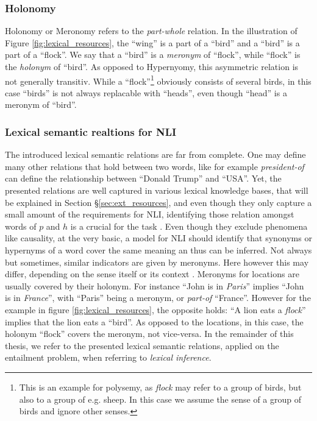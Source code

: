 \subsubsection{Holonomy}
Holonomy or Meronomy refers to the \textit{part-whole} relation. In the illustration of Figure \ref{fig:lexical_resources}, the ``wing'' is a part of a ``bird'' and a ``bird'' is a part of a ``flock''. We say that a ``bird'' is a \textit{meronym} of ``flock'', while ``flock'' is the \textit{holonym} of ``bird''. As opposed to Hypernyomy, this asymmetric relation is not generally transitiv. While a ``flock''\footnote{This is an example for polysemy, as \textit{flock} may refer to a group of birds, but also to a group of e.g. sheep. In this case we assume the sense of a group of birds and ignore other senses.} obviously consists of several birds, in this case ``birds'' is not always replacable with ``heads'', even though ``head'' is a meronym of ``bird''. 
\subsubsection{Lexical semantic realtions for \ac{NLI}}
The introduced lexical semantic relations are far from complete. One may define many other relations that hold between two words, like for example \textit{president-of} can define the relationship between ``Donald Trump'' and ``USA''. Yet, the presented relations are well captured in various lexical knowledge bases, that will be explained in Section §\ref{sec:ext_resources}, and even though they only capture a small amount of the requirements for \ac{NLI}, identifying those relation amongst words of $p$ and $h$ is a crucial for the task \citep{shwartz2015learning}. Even though they exclude phenomena like causality, at the very basic, a model for \ac{NLI} should identify that synonyms or hypernyms of a word cover the same meaning an thus can be inferred. Not always but sometimes, similar indicators are given by meronyms. Here however this may differ, depending on the sense itself or its context \citep{shwartz2015learning}. Meronyms for locations are usually covered by their holonym. For instance ``John is in \textit{Paris}'' implies ``John is in \textit{France}'', with ``Paris'' being a meronym, or \textit{part-of} ``France''. However for the example in figure \ref{fig:lexical_resources}, the opposite holds: ``A lion eats a \textit{flock}'' implies that the lion eats a ``bird''. As opposed to the locations, in this case, the holonym ``flock'' covers the meronym, not vice-versa. In the remainder of this thesis, we refer to the presented lexical semantic relations, applied on the entailment problem, when referring to \textit{lexical inference}.
